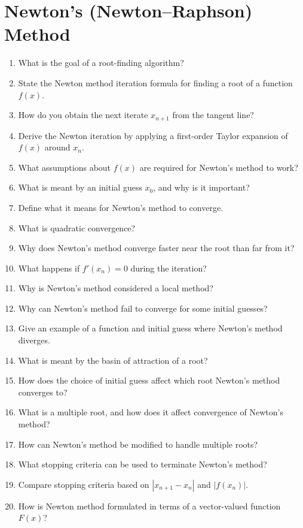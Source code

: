 \section{Newton's (Newton--Raphson) Method}

\begin{enumerate}
  \item What is the goal of a root-finding algorithm?
  \item State the Newton method iteration formula for finding a root of a function \(f(x)\).
  \item How do you obtain the next iterate \(x_{n+1}\) from the tangent line?
  \item Derive the Newton iteration by applying a first-order Taylor expansion of \(f(x)\) around \(x_{n}\).
  \item What assumptions about \(f(x)\) are required for Newton's method to work?
  \item What is meant by an initial guess \(x_{0}\), and why is it important?
  \item Define what it means for Newton's method to converge.
  \item What is quadratic convergence?
  \item Why does Newton's method converge faster near the root than far from it?
  \item What happens if \(f'(x_{n}) = 0\) during the iteration?
  \item Why is Newton's method considered a local method?
  \item Why can Newton's method fail to converge for some initial guesses?
  \item Give an example of a function and initial guess where Newton's method diverges.
  \item What is meant by the basin of attraction of a root?
  \item How does the choice of initial guess affect which root Newton's method converges to?
  \item What is a multiple root, and how does it affect convergence of Newton's method?
  \item How can Newton's method be modified to handle multiple roots?
  \item What stopping criteria can be used to terminate Newton's method?
  \item Compare stopping criteria based on \(|x_{n+1}- x_{n}|\) and \(|f(x_{n})|\).
  \item How is Newton method formulated in terms of a vector-valued function \(F(x)\)?

\end{enumerate}
